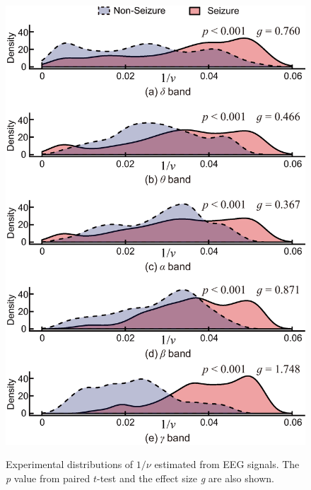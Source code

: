 \documentclass[journal]{IEEEtran}
\begin{document}
\begin{figure}[!t]　%
\centering
\includegraphics[width=1.0\hsize]{figure/dens_test_20_ver2.eps}
\caption{Experimental distributions of $1/\nu$ estimated from EEG signals. The \textit{p} value from paired $t$-test and the effect size \textit{g} are also shown. }
\label{fig:dens}
\end{figure}
\end{document}
